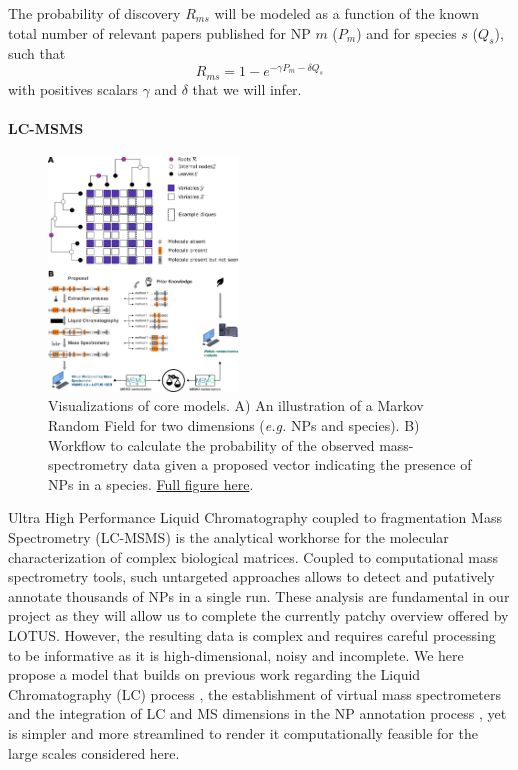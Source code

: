 \documentclass[
11pt, %
oneside, %
english, %
singlespacing, %
headsepline, %
chapterinoneline, %
]{MastersDoctoralThesis} %
\begin{document}
The probability of discovery $R_{ms}$ will be modeled as a function of the known total number of relevant papers published for NP $m$ ($P_m$) and for species $s$ ($Q_s$), such that
\begin{equation*}
	R_{ms} = 1 - e^{-\gamma P_m - \delta Q_s}
\end{equation*}
with positives scalars $\gamma$ and $\delta$ that we will infer.

\paragraph{LC-MSMS}\label{sec:ModellingLCMS}

\begin{figure}
	\centering
	\includegraphics[width=0.45\textwidth]{./images/method_figure_complete_vertical.pdf}
	\caption{Visualizations of core models. A) An illustration of a Markov Random Field for two dimensions (\textit{e.g.} NPs and species). B) Workflow to calculate the probability of the observed mass-spectrometry data given a proposed vector indicating the presence of NPs in a species. \href{https://commons-research.github.io/snf-anticipating-the-chemistry-of-life/method_figure_complete_vertical.pdf}{Full figure here}.}
	\label{fig:method-overview}
\end{figure}


Ultra High Performance Liquid Chromatography coupled to fragmentation Mass Spectrometry (LC-MSMS) is the analytical workhorse for the molecular characterization of complex biological matrices. Coupled to computational mass spectrometry tools, such untargeted approaches allows to detect and putatively annotate thousands of NPs in a single run. These analysis are fundamental in our project as they will allow us to complete the currently patchy overview offered by LOTUS. However, the resulting data is complex and requires careful processing to be informative as it is high-dimensional, noisy and incomplete. We here propose a model that builds on previous work regarding the Liquid Chromatography (LC) process \cite{heymann_2023,wiczling_2021}, the establishment of virtual mass spectrometers \cite{wandy_2019,wandy_2022,wandy_2023} and the integration of LC and MS dimensions in the NP annotation process \cite{bach_2021, bach_2022}, yet is simpler and more streamlined to render it computationally feasible for the large scales considered here.
\end{document}
